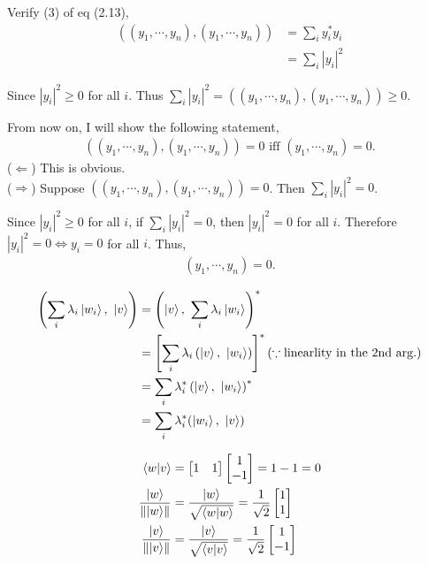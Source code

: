 Verify (3) of eq (2.13),
\begin{align*}
	\left(
		(y_1, \cdots, y_n), (y_1, \cdots, y_n)
	\right)
	&= \sum_i y_i^* y_i\\
	&= \sum_i |y_i|^2
\end{align*}

Since $|y_i|^2 \geq 0$ for all $i$. Thus
$\sum_i |y_i|^2 =
\left(
	(y_1, \cdots, y_n), (y_1, \cdots, y_n)
\right) \geq 0
$.

From now on,  I will show the following statement,
\begin{align*}
	\left(
		(y_1, \cdots, y_n), (y_1, \cdots, y_n)
	\right) = 0
	\text{ iff }  (y_1, \cdots, y_n) = 0.
\end{align*}
($\Leftarrow$) This is obvious.\\
($\Rightarrow$)
Suppose $\left( (y_1, \cdots, y_n), (y_1, \cdots, y_n) \right) = 0$. Then $\sum_i |y_i|^2 = 0$.

Since $|y_i|^2 \geq 0$ for all $i$, if $\sum_i |y_i|^2 = 0$, then $|y_i|^2 = 0$ for all $i$.
Therefore $|y_i|^2 = 0 \Leftrightarrow y_i = 0$  for all $i$.
Thus,
\begin{align*}
	(y_1, \cdots, y_n) = 0.
\end{align*}

\begin{align*}
	\left(\sum_i \lambda_i \ket{w_i},\ \ket{v}\right) &=
	\left(\ket{v},\ \sum_i \lambda_i \ket{w_i}\right)^*\\
	&= \left[\sum_i \lambda_i \left(\ket{v},\ \ket{w_i}  \right) \right]^* (\because \text{linearlity in the 2nd arg.})\\
	&= \sum_i \lambda_i^* \left(\ket{v},\ \ket{w_i} \right)^*\\
	&= \sum_i \lambda_i^* (\ket{w_i},\ \ket{v})
\end{align*}



\begin{align*}
	\braket{w | v} &= \begin{bmatrix}
		1 & 1
	\end{bmatrix}
	\begin{bmatrix}
	1 \\
	-1
	\end{bmatrix}
	= 1 - 1 = 0\\
%
	\frac{\ket{w}}{\norm{\ket{w}}} &=
	\frac{\ket{w}}{\sqrt{\braket{w|w}}} = \frac{1}{\sqrt{2}} \begin{bmatrix}
	1 \\
	1
	\end{bmatrix}\\
%
	\frac{\ket{v}}{\norm{\ket{v}}} &=
	\frac{\ket{v}}{\sqrt{\braket{v|v}}} = \frac{1}{\sqrt{2}} \begin{bmatrix}
	1 \\
	-1
	\end{bmatrix}
\end{align*}



